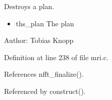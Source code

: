 Destroys a plan. 

\begin{itemize}
\item ths\_\-plan The plan\end{itemize}
\begin{Desc}
\item[Author:]Tobias Knopp \end{Desc}


Definition at line 238 of file mri.c.

References nfft\_\-finalize().

Referenced by construct().
